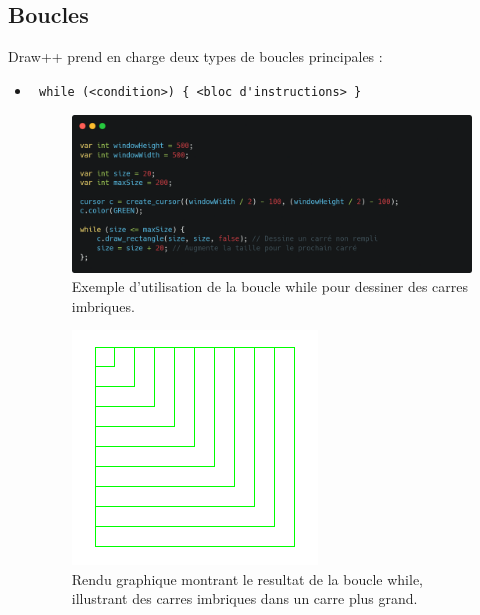 \documentclass[12pt,a4paper]{report}
\begin{document}
\subsection{Boucles}
Draw++ prend en charge deux types de boucles principales :
\begin{itemize}
    \item \begin{verbatim} while (<condition>) { <bloc d'instructions> } \end{verbatim}

    \begin{figure}[H]
    \includegraphics[width=1\linewidth]{assets/code/While_dpp.png}
    \caption{\centering Exemple d'utilisation de la boucle while pour dessiner des carres imbriques.}
\end{figure}
\begin{figure}[H]
    \centering
    \includegraphics[width=0.3\linewidth]{assets/render/while.png}
    \caption{\centering Rendu graphique montrant le resultat de la boucle while, illustrant des carres imbriques dans un carre plus grand.}
\end{figure}


\end{itemize}
\end{document}

